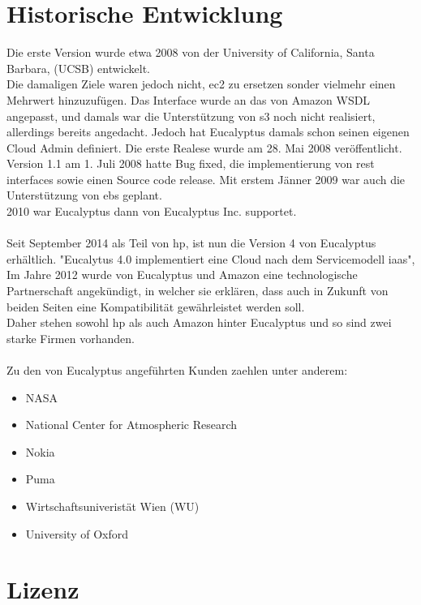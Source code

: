 \documentclass[a4paper,nochapterprefix,english,12pt]{scrreprt}
\begin{document}
\section{Historische Entwicklung}
Die erste Version wurde etwa 2008 von der University of California, Santa Barbara, (UCSB) entwickelt. \\
Die damaligen Ziele waren jedoch nicht, \gls{ec2} zu ersetzen sonder vielmehr einen Mehrwert hinzuzufügen.
Das Interface wurde an das von Amazon WSDL angepasst, und damals war die Unterstützung von \gls{s3} noch nicht realisiert, allerdings bereits angedacht. Jedoch hat Eucalyptus damals schon seinen eigenen Cloud Admin definiert. Die erste Realese wurde am 28. Mai 2008 veröffentlicht. \\
Version 1.1 am 1. Juli 2008 hatte Bug fixed, die implementierung von \gls{rest} interfaces sowie einen Source code release. Mit erstem Jänner 2009 war auch die Unterstützung von \gls{ebs} geplant. 
\cite{EucalyptusSlideShare} \\
2010 war Eucalyptus dann von Eucalyptus Inc. supportet. \cite{Eucalyptus2010}
\\ \\
Seit September 2014 als Teil von \gls{hp}, ist nun die Version 4 von Eucalyptus erhältlich. "Eucalytus 4.0 implementiert eine Cloud nach dem Servicemodell \gls{iaas}", \cite{EucalyptusV4}\\
Im Jahre 2012 wurde von Eucalyptus und Amazon eine technologische Partnerschaft angekündigt, in welcher sie erklären, dass auch in Zukunft von beiden Seiten eine Kompatibilität gewährleistet werden soll.\cite{EucalyptusAWSPart} \\
Daher stehen sowohl \gls{hp} als auch Amazon hinter Eucalyptus und so sind zwei starke Firmen vorhanden.\\
\\
Zu den von Eucalyptus angeführten Kunden zaehlen unter anderem:
\begin{itemize}
\item NASA
\item National Center for Atmospheric Research 
\item Nokia
\item Puma
\item Wirtschaftsuniveristät Wien (WU)
\item University of Oxford
\end{itemize}
\cite{EucalyptusCustomers}
\section{Lizenz}
\end{document}
